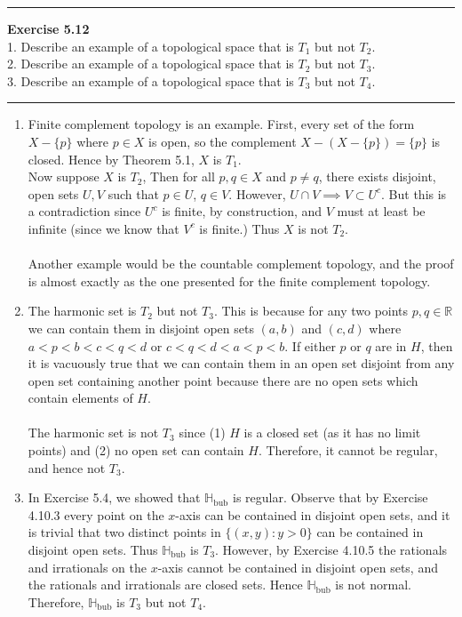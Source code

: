 \documentclass[a4paper,12pt,twoside]{hmcpset}
\begin{document}
\noindent\rule{18cm}{1pt}
\noindent
\textbf{Exercise 5.12}\\
1. Describe an example of a topological space that is $T_1$ but not
$T_2$.\\
2. Describe an example of a topological space that is $T_2$ but not
$T_3$.\\
3. Describe an example of a topological space that is $T_3$ but not
$T_4$.\\
\noindent\rule{18cm}{1pt}
\begin{enumerate}
    \item Finite complement topology is an example. First, every set 
     of the form $X - \{p\}$ where $p \in X$ is open, so the
     complement $X - (X - \{p\}) = \{p\}$ is closed. Hence by 
     Theorem 5.1, $X$ is $T_1$. 
     \\
    Now suppose $X$ is $T_2$, Then for all $p, q \in X$ and $p \ne q$,
    there exists disjoint, open sets $U, V$ such that $p \in U$, $q
    \in V$. However, $U \cap V \implies V \subset U^c$. 
    But this is a contradiction since $U^c$ is finite, by
    construction, and $V$ must at least be infinite (since we know
    that $V^c$ is finite.) Thus $X$ is not $T_2$.
    \\
    \\
    Another example would be the countable complement topology, and
    the proof is almost exactly as the one presented for the finite
    complement topology.

    \item The harmonic set is $T_2$ but not $T_3$. This is because for
    any two points $p, q \in \mathbb{R}$ we can contain them in
    disjoint open sets $(a, b)$ and $(c, d)$ where $a < p < b < c < q
    < d$ or $c < q < d < a < p < b$. If either $p$ or $q$ are in $H$,
    then it is vacuously true that we can contain them in an open set
    disjoint from any open set containing another point because there
    are no open sets which contain elements of $H$.
    \\
    \\
    The harmonic set is not $T_3$ since (1) $H$ is a closed set (as it
    has no limit points) and (2) no open set can contain $H$.
    Therefore, it cannot be regular, and hence not $T_3$.
    
    \item In Exercise 5.4, we showed that $\mathbb{H}_\text{bub}$ is
    regular. Observe that by Exercise 4.10.3 every point on the
    $x$-axis can be contained in disjoint open sets, and it is trivial
    that two distinct points in $\{(x,y) : y > 0\}$ can be contained in
    disjoint open sets. Thus $\mathbb{H}_\text{bub}$ is $T_3$.
    However, by Exercise 4.10.5 the rationals and irrationals on the
    $x$-axis cannot be contained in disjoint open sets, and the
    rationals and irrationals are closed sets. Hence
    $\mathbb{H}_\text{bub}$ is not normal. Therefore,
    $\mathbb{H}_\text{bub}$ is $T_3$ but not $T_4$. 
    
\end{enumerate}
    
\end{document}
